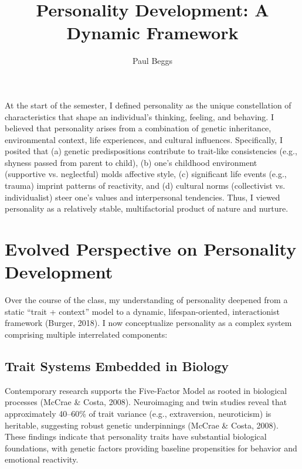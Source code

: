 \documentclass[stu]{apa7}
\title{Personality Development: A Dynamic Framework}
\author{Paul Beggs}
\begin{document}
\maketitle

At the start of the semester, I defined personality as the unique constellation of characteristics that shape an individual's thinking, feeling, and behaving. I believed that personality arises from a combination of genetic inheritance, environmental context, life experiences, and cultural influences. Specifically, I posited that (a) genetic predispositions contribute to trait-like consistencies (e.g., shyness passed from parent to child), (b) one's childhood environment (supportive vs. neglectful) molds affective style, (c) significant life events (e.g., trauma) imprint patterns of reactivity, and (d) cultural norms (collectivist vs. individualist) steer one's values and interpersonal tendencies. Thus, I viewed personality as a relatively stable, multifactorial product of nature and nurture.

\section{Evolved Perspective on Personality Development}

Over the course of the class, my understanding of personality deepened from a static ``trait + context'' model to a dynamic, lifespan-oriented, interactionist framework (Burger, 2018). I now conceptualize personality as a complex system comprising multiple interrelated components:

\subsection{Trait Systems Embedded in Biology}

Contemporary research supports the Five-Factor Model as rooted in biological processes (McCrae \& Costa, 2008). %
 Neuroimaging and twin studies reveal that approximately 40–60\% of trait variance (e.g., extraversion, neuroticism) is heritable, suggesting robust genetic underpinnings (McCrae \& Costa, 2008). These findings indicate that personality traits have substantial biological foundations, with genetic factors providing baseline propensities for behavior and emotional reactivity.
\end{document}
